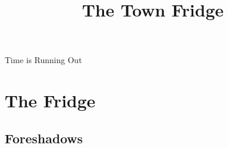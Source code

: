 \documentclass[a4paper,openany]{book}
\title{The Town Fridge}
\begin{document}
%
  {Time is Running Out}%

\glsunsetall


\printglossary[
  style=topicmcols,
  ]

\printglossary[
  type=mech,
  style=topicmcols,
  ]

\mainmatter
\glsresetall

\chapter{The Fridge}

\section{Foreshadows}

\begin{multicols}{2}
  
\end{multicols}



\backmatter
\end{document}
